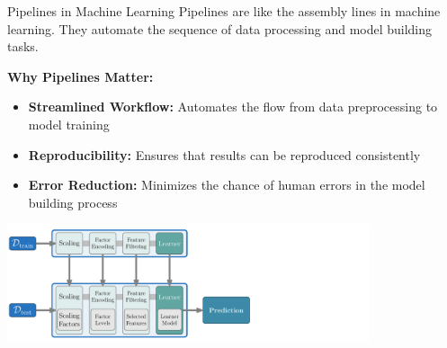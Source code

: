 \documentclass[11pt,compress,t,notes=noshow, xcolor=table]{beamer}
\begin{document}
\begin{vbframe}{Pipelines in Machine Learning}
Pipelines are like the assembly lines in machine learning. They automate the sequence of data processing and model building tasks.
\vspace{1em}

\textbf{Why Pipelines Matter:}
\begin{itemize}
\item \small \textbf{Streamlined Workflow:} Automates the flow from data preprocessing to model training
\item \small \textbf{Reproducibility:} Ensures that results can be reproduced consistently
\item \small \textbf{Error Reduction:} Minimizes the chance of human errors in the model building process
\end{itemize}

\begin{center}
\includegraphics[width = 0.8\textwidth]{figure_man/linear_pipeline-no_circle.png}
\end{center}

\end{vbframe}



\endlecture
\end{document}
